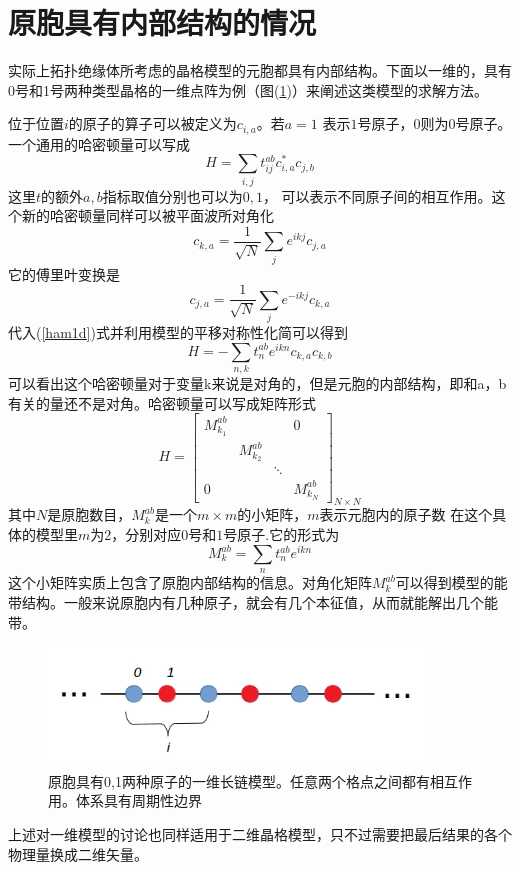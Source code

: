 \section{原胞具有内部结构的情况}
实际上拓扑绝缘体所考虑的晶格模型的元胞都具有内部结构。下面以一维的，具有0号和1号两种类型晶格的一维点阵为例（图(\ref{tbInnerStruct})）来阐述这类模型的求解方法。

位于位置$i$的原子的算子可以被定义为$c_{i,a}$。若$a = 1$ 表示$1$号原子，$0$则为$0$号原子。一个通用的哈密顿量可以写成
\begin{equation}
H = \sum_{i, j} t_{ij}^{ab}c_{i,a}^{*}c_{j, b}
\label{ham1d}
\end{equation}
这里$t$的额外$a, b$指标取值分别也可以为$0, 1$， 可以表示不同原子间的相互作用。这个新的哈密顿量同样可以被平面波所对角化
\begin{equation}
  c_{k, a} = \frac{1}{\sqrt{N}} \sum_j e^{ikj} c_{j,a}
\end{equation}
它的傅里叶变换是
\begin{equation}
  c_{j, a} = \frac{1}{\sqrt{N}} \sum_j e^{-ikj} c_{k,a}
\end{equation}
代入(\ref{ham1d})式并利用模型的平移对称性化简可以得到
\begin{equation}
  H = - \sum_{n, k} t_n^{ab} e^{ikn} c_{k, a}c_{k, b}
\end{equation}
可以看出这个哈密顿量对于变量k来说是对角的，但是元胞的内部结构，即和a，b有关的量还不是对角。哈密顿量可以写成矩阵形式
\begin{equation}
        H = \begin{bmatrix}

        M^{ab}_{k_1}    &    &  & 0 \\
            &  M^{ab}_{k_2}  &  & \\

        &   & \ddots &  \\

        0  &  &   & M^{ab}_{k_N}


        \end{bmatrix}_{N \times N}
\end{equation}
其中$N$是原胞数目，$M^{ab}_k$是一个$m \times m$的小矩阵，$m$表示元胞内的原子数
在这个具体的模型里$m$为$2$，分别对应$0$号和$1$号原子.它的形式为
\begin{equation}
  M^{ab}_k = \sum_n t^{ab}_n e^{ikn}
\end{equation}
这个小矩阵实质上包含了原胞内部结构的信息。对角化矩阵$M^{ab}_k$可以得到模型的能带结构。一般来说原胞内有几种原子，就会有几个本征值，从而就能解出几个能带。
\begin {figure}[btp]
\centering 
\includegraphics[width=10cm]{./images/tbInnerStruct.jpg} 
\caption{原胞具有0,1两种原子的一维长链模型。任意两个格点之间都有相互作用。体系具有周期性边界}
\label{tbInnerStruct}
\end {figure} 
上述对一维模型的讨论也同样适用于二维晶格模型，只不过需要把最后结果的各个物理量换成二维矢量。
